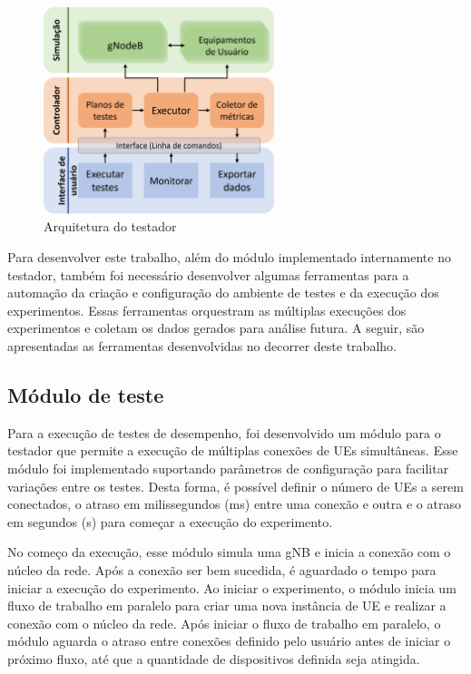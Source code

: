 \begin{figure}[!ht]
    \centering
    \includegraphics[width=0.6\textwidth]{TG2/Chapters/Soluction/Figures/Arquitetura-Componentes.png}
    \caption{Arquitetura do testador}
    \label{fig:tester_arch}
\end{figure}


Para desenvolver este trabalho, além do módulo implementado internamente no testador, também foi necessário desenvolver algumas ferramentas para a automação da criação e configuração do ambiente de testes e da execução dos experimentos. Essas ferramentas orquestram as múltiplas execuções dos experimentos e coletam os dados gerados para análise futura. A seguir, são apresentadas as ferramentas desenvolvidas no decorrer deste trabalho.

\subsection{Módulo de teste}

Para a execução de testes de desempenho, foi desenvolvido um módulo para o testador que permite a execução de múltiplas conexões de UEs simultâneas.
Esse módulo foi implementado suportando parâmetros de configuração para facilitar variações entre os testes. 
Desta forma, é possível definir o número de UEs a serem conectados, o atraso em milissegundos (ms) entre uma conexão e outra e o atraso em segundos (s) para começar a execução do experimento.

No começo da execução, esse módulo simula uma gNB e inicia a conexão com o núcleo da rede. Após a conexão ser bem sucedida, é aguardado o tempo para iniciar a execução do experimento.
Ao iniciar o experimento, o módulo inicia um fluxo de trabalho em paralelo para criar uma nova instância de UE e realizar a conexão com o núcleo da rede.
Após iniciar o fluxo de trabalho em paralelo, o módulo aguarda o atraso entre conexões definido pelo usuário antes de iniciar o próximo fluxo, até que a quantidade de dispositivos definida seja atingida.

